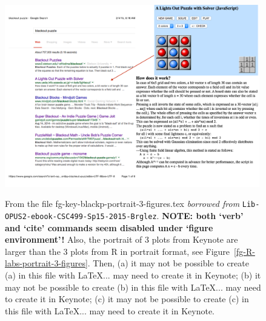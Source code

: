 \begin{figure}[t!]
\vspace*{1ex}%
\\
\includegraphics[width=0.99\textwidth]{fg-key-blackp-descr-a}
\vspace*{1ex}%
%
\caption[From the file fg-key-blackp-normal-3-figures.tex]
{From the file fg-key-blackp-portrait-3-figures.tex {\em borrowed from} {\tt Lib-OPUS2-ebook-CSC499-Sp15-2015-Brglez}.
{\bf NOTE: both `verb' and `cite' commands seem disabled under `figure environment'!}
Also, the portrait of 3 plots from Keynote are larger than the 3 plots from R in portrait format,
see Figure~\ref{fg-R-labs-portrait-3-figures}.
Then,
(a) 
it may not be possible to create (a) in this file with \LaTeX ... may need to create it in Keynote;
%
(b)
it may not be possible to create (b) in this file with \LaTeX ... may need to create it in Keynote;
%
(c)
it may not be possible to create (c) in this file with \LaTeX ... may need to create it in Keynote.
}
\label{fg-key-blackp-normal-3-figures}
\end{figure}


